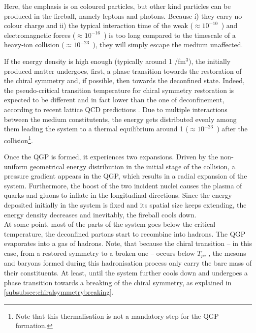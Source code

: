 Here, the emphasis is on coloured particles, but other kind particles can be produced in the fireball, namely leptons and photons. Because i) they carry no colour charge and ii) the typical interaction time of the weak ($\approx 10^{-10}$~\second) and electromagnetic forces ($\approx 10^{-16}$~\second) is too long compared to the timescale of a heavy-ion collision ($\approx 10^{-23}$~\second), they will simply escape the medium unaffected.



If the energy density is high enough (typically around 1 \gev/fm$^{3}$), the initially produced matter undergoes, first, a phase transition towards the restoration of the chiral symmetry and, if possible, then towards the deconfined state.
Indeed, the pseudo-critical transition temperature for chiral symmetry restoration is expected to be different and in fact lower than the one of deconfinement, according to recent lattice QCD predictions \cite{dingChiralPhaseTransition2019}.
Due to multiple interactions between the medium constitutents, the energy gets distributed evenly among them leading the system to a thermal equilibrium around 1 \fmC ($\approx 10^{-23}$~\second) after the collision\footnote{Note that this thermalisation is not a mandatory step for the QGP formation.}.

Once the QGP is formed, it experiences two expansions. Driven by the non-uniform geometrical energy distribution in the initial stage of the collision, a pressure gradient appears in the QGP, which results in a radial expansion of the system. Furthermore, the boost of the two incident nuclei causes the plasma of quarks and gluons to inflate in the longitudinal directions. Since the energy deposited initially in the system is fixed and its spatial size keeps extending, the energy density decreases and inevitably, the fireball cools down.\\

At some point, most of the parts of the system goes below the critical temperature, the deconfined partons start to recombine into hadrons. The QGP evaporates into a gas of hadrons. Note, that because the chiral transition -- in this case, from a restored symmetry to a broken one -- occurs below $T_{pc}$ \cite{dingChiralPhaseTransition2019}, the mesons and baryons formed during this hadronisation process only carry the bare mass of their constituents. At least, until the system further cools down and undergoes a phase transition towards a breaking of the chiral symmetry, as explained in \Sec\ref{subsubsec:chiralsymmetrybreaking}.

